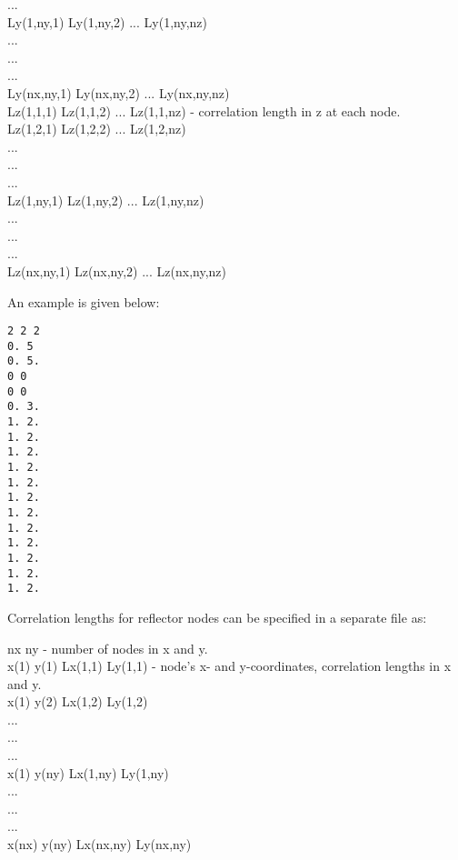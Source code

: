 \documentclass[twoside,final,onecolumn]{article}
\begin{document}
\begin{framed}
.\hphantom{Lx(1,2,1)---}.\hphantom{Lx(1,2,2)------}.\\
Ly(1,ny,1) Ly(1,ny,2) ... Ly(1,ny,nz)\\
.\hphantom{Lx(1,ny,1)---}.\hphantom{Lx(1,ny,nz)----}.\\
.\hphantom{Lx(1,ny,1)---}.\hphantom{Lx(1,ny,nz)----}.\\
.\hphantom{Lx(1,ny,1)---}.\hphantom{Lx(1,ny,nz)----}.\\
Ly(nx,ny,1) Ly(nx,ny,2) ... Ly(nx,ny,nz)\\
Lz(1,1,1) Lz(1,1,2) ... Lz(1,1,nz) \qquad\qquad- correlation length in z at each node.\\
Lz(1,2,1) Lz(1,2,2) ... Lz(1,2,nz)\\
.\hphantom{Lx(1,2,1)---}.\hphantom{Lx(1,2,2)------}.\\
.\hphantom{Lx(1,2,1)---}.\hphantom{Lx(1,2,2)------}.\\
.\hphantom{Lx(1,2,1)---}.\hphantom{Lx(1,2,2)------}.\\
Lz(1,ny,1) Lz(1,ny,2) ... Lz(1,ny,nz)\\
.\hphantom{Lx(1,ny,1)---}.\hphantom{Lx(1,ny,nz)----}.\\
.\hphantom{Lx(1,ny,1)---}.\hphantom{Lx(1,ny,nz)----}.\\
.\hphantom{Lx(1,ny,1)---}.\hphantom{Lx(1,ny,nz)----}.\\
Lz(nx,ny,1) Lz(nx,ny,2) ... Lz(nx,ny,nz)
\end{framed}

An example is given below:

\begin{verbatim}
2 2 2
0. 5
0. 5.
0 0
0 0
0. 3.
1. 2.
1. 2.
1. 2.
1. 2.
1. 2.
1. 2.
1. 2.
1. 2.
1. 2.
1. 2.
1. 2.
1. 2.
\end{verbatim}

Correlation lengths for reflector nodes can be specified in a separate file as:

\begin{framed}
\noindent nx ny \qquad\qquad\hphantom{y(1) Lx(1,1) Ly(1,}- number of nodes in x and y. \\
x(1) y(1) Lx(1,1) Ly(1,1) \qquad\qquad- node's x- and y-coordinates, correlation lengths in x and y.\\
x(1) y(2) Lx(1,2) Ly(1,2)\\
.\hphantom{Lx(1,2,1)---}.\hphantom{Lx(1,2,2)------}.\\
.\hphantom{Lx(1,2,1)---}.\hphantom{Lx(1,2,2)------}.\\
.\hphantom{Lx(1,2,1)---}.\hphantom{Lx(1,2,2)------}.\\
x(1) y(ny) Lx(1,ny) Ly(1,ny)\\
.\hphantom{Lx(1,2,1)---}.\hphantom{Lx(1,2,2)------}.\\
.\hphantom{Lx(1,2,1)---}.\hphantom{Lx(1,2,2)------}.\\
.\hphantom{Lx(1,2,1)---}.\hphantom{Lx(1,2,2)------}.\\
x(nx) y(ny) Lx(nx,ny) Ly(nx,ny)
\end{framed}
\end{document}
